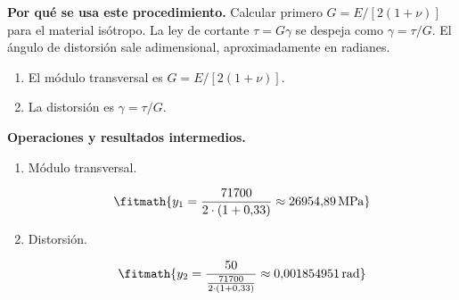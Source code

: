 \noindent\textbf{Por qué se usa este procedimiento.} Calcular primero $G=E/[2(1+\nu)]$ para el material isótropo. La ley de cortante $\tau=G\gamma$ se despeja como $\gamma=\tau/G$. El ángulo de distorsión sale adimensional, aproximadamente en radianes.

\begin{enumerate}

\item El módulo transversal es $G = E/[2(1+\nu)]$.

\item La distorsión es $\gamma = \tau/G$.

\end{enumerate}

\noindent\textbf{Operaciones y resultados intermedios.}

\begin{enumerate}

\item Módulo transversal.

\[\fitmath{y_{1}=\frac{71700}{2\cdot \left(1+0{,}33\right)}\approx 26954{,}89\,\mathrm{MPa}}\]

\item Distorsión.

\[\fitmath{y_{2}=\frac{50}{\frac{71700}{2\cdot \left(1+0{,}33\right)}}\approx 0{,}001854951\,\mathrm{rad}}\]

\end{enumerate}
